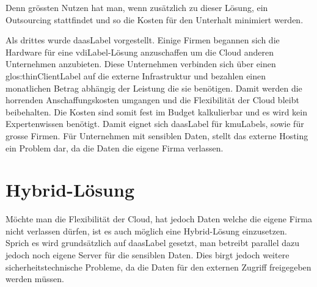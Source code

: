 Denn grössten Nutzen hat man, wenn zusätzlich zu dieser Lösung, ein Outsourcing stattfindet und so die Kosten für den Unterhalt minimiert werden.

Als drittes wurde \Gls{daasLabel} vorgestellt. Einige Firmen begannen sich die Hardware für eine \Gls{vdiLabel}-Lösung anzuschaffen um die Cloud anderen Unternehmen anzubieten. Diese Unternehmen verbinden sich über einen \Gls{glos:thinClientLabel} auf die externe Infrastruktur und bezahlen einen monatlichen Betrag abhängig der Leistung die sie benötigen. Damit werden die horrenden Anschaffungskosten umgangen und die Flexibilität der Cloud bleibt beibehalten. Die Kosten sind somit fest im Budget kalkulierbar und es wird kein Expertenwissen benötigt. Damit eignet sich \Gls{daasLabel} für \Glspl{kmuLabel}, sowie für grosse Firmen. Für Unternehmen mit sensiblen Daten, stellt das externe Hosting ein Problem dar, da die Daten die eigene Firma verlassen.

\section{Hybrid-Lösung}
Möchte man die Flexibilität der Cloud, hat jedoch Daten welche die eigene Firma nicht verlassen dürfen, ist es auch möglich eine Hybrid-Lösung einzusetzen. Sprich es wird grundsätzlich auf \Gls{daasLabel} gesetzt, man betreibt parallel dazu jedoch noch eigene Server für die sensiblen Daten.
Dies birgt jedoch weitere sicherheitstechnische Probleme, da die Daten für den externen Zugriff freigegeben werden müssen.



\glsaddall

